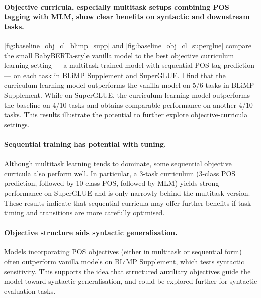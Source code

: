 \paragraph{Objective curricula, especially multitask setups combining POS tagging with MLM, show clear benefits on syntactic and downstream tasks.} \cref{fig:baseline_obj_cl_blimp_supp} and \cref{fig:baseline_obj_cl_superglue} compare the small BabyBERTa-style vanilla model to the best objective curriculum learning setting --- a multitask trained model with sequential POS-tag prediction --- on each task in BLiMP Supplement and SuperGLUE. I find that the curriculum learning model outperforms the vanilla model on 5/6 tasks in BLiMP Supplement. While on SuperGLUE, the curriculum learning model outperforms the baseline on 4/10 tasks and obtains comparable performance on another 4/10 tasks. This results illustrate the potential to further explore objective-curricula settings.




\paragraph{Sequential training has potential with tuning.}
Although multitask learning tends to dominate, some sequential objective curricula also perform well. In particular, a 3-task curriculum (3-class POS prediction, followed by 10-class POS, followed by MLM) yields strong performance on SuperGLUE and is only narrowly behind the multitask version. These results indicate that sequential curricula may offer further benefits if task timing and transitions are more carefully optimised.

\paragraph{Objective structure aids syntactic generalisation.}
Models incorporating POS objectives (either in multitask or sequential form) often outperform vanilla models on BLiMP Supplement, which tests syntactic sensitivity. This supports the idea that structured auxiliary objectives guide the model toward syntactic generalisation, and could be explored further for syntactic evaluation tasks.

